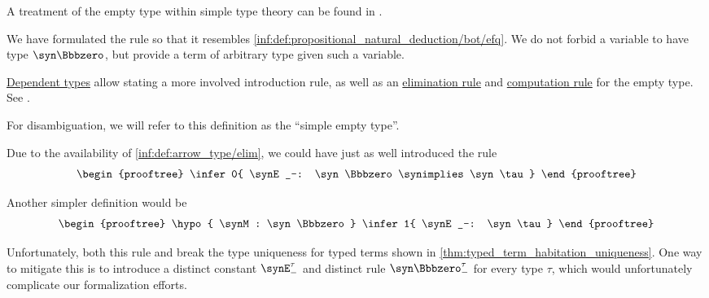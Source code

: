 \begin{comments}
  \item A treatment of the empty type within simple type theory can be found in \cite[\S 4.3.4]{Mimram2020ProgramEqualsProof}.

  \item We have formulated the rule so that it resembles \ref{inf:def:propositional_natural_deduction/bot/efq}. We do not forbid a variable to have type \( \syn\Bbbzero \), but provide a term of arbitrary type given such a variable.

  \item \hyperref[con:dependent_type]{Dependent types} allow stating a more involved introduction rule, as well as an \hyperref[rem:type_theory_rule_classification/intro]{elimination rule} and \hyperref[rem:type_theory_rule_classification/equality/comp]{computation rule} for the empty type. See .

  For disambiguation, we will refer to this definition as the \enquote{simple empty type}.

  \item Due to the availability of \ref{inf:def:arrow_type/elim}, we could have just as well introduced the rule
  \begin{equation*}
    \begin{prooftree}
      \infer0{ \synE_-: \syn\Bbbzero \synimplies \syn\tau }
    \end{prooftree}
  \end{equation*}

  Another simpler definition would be
  \begin{equation*}
    \begin{prooftree}
      \hypo{ \synM: \syn\Bbbzero }
      \infer1{ \synE_-: \syn\tau }
    \end{prooftree}
  \end{equation*}

  Unfortunately, both this rule and break the type uniqueness for typed terms shown in \cref{thm:typed_term_habitation_uniqueness}. One way to mitigate this is to introduce a distinct constant \( \synE_-^\tau \) and distinct rule \( \syn\Bbbzero_-^\tau \) for every type \( \tau \), which would unfortunately complicate our formalization efforts.
\end{comments}

